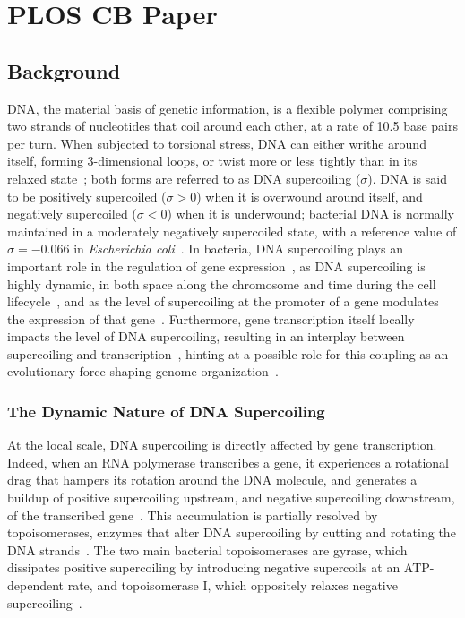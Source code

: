 \chapter{PLOS CB Paper}

\section{Background}

DNA, the material basis of genetic information, is a flexible polymer comprising two strands of nucleotides that coil around each other, at a rate of 10.5 base pairs per turn.
When subjected to torsional stress, DNA can either writhe around itself, forming 3-dimensional loops, or twist more or less tightly than in its relaxed state~\citep{krogh2018}; both forms are referred to as DNA supercoiling ($\sigma$).
DNA is said to be positively supercoiled ($\sigma > 0$) when it is overwound around itself, and negatively supercoiled ($\sigma < 0$) when it is underwound; bacterial DNA is normally maintained in a moderately negatively supercoiled state, with a reference value of $\sigma=-0.066$ in \emph{Escherichia coli}~\citep{crozat2005}.
In bacteria, DNA supercoiling plays an important role in the regulation of gene expression~\citep{martisb.2019}, as DNA supercoiling is highly dynamic, in both space along the chromosome and time during the cell lifecycle~\citep{krogh2018}, and as the level of supercoiling at the promoter of a gene modulates the expression of that gene~\citep{forquet2021}.
Furthermore, gene transcription itself locally impacts the level of DNA supercoiling, resulting in an interplay between supercoiling and transcription~\citep{meyer2014,dorman2019}, hinting at a possible role for this coupling as an evolutionary force shaping genome organization~\citep{junier2016}.

\subsection{The Dynamic Nature of DNA Supercoiling}

At the local scale, DNA supercoiling is directly affected by gene transcription.
Indeed, when an RNA polymerase transcribes a gene, it experiences a rotational drag that hampers its rotation around the DNA molecule, and generates a buildup of positive supercoiling upstream, and negative supercoiling downstream, of the transcribed gene~\citep{liu1987,ma2016}.
This accumulation is partially resolved by topoisomerases, enzymes that alter DNA supercoiling by cutting and rotating the DNA strands~\citep*{duprey2021}.
The two main bacterial topoisomerases are gyrase, which dissipates positive supercoiling by introducing negative supercoils at an ATP-dependent rate, and topoisomerase I, which oppositely relaxes negative supercoiling~\citep{martisb.2019}.

